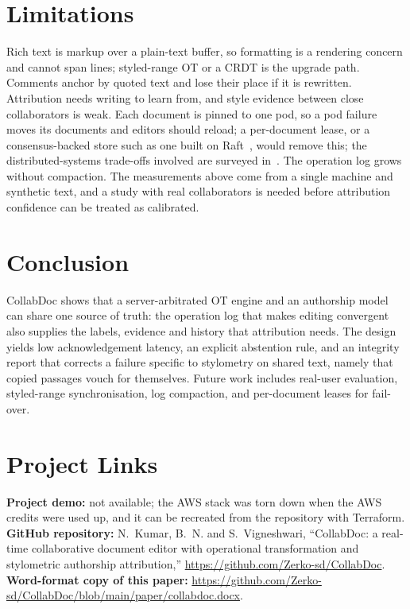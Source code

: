 \documentclass[conference]{IEEEtran}
\begin{document}
\section{Limitations}
Rich text is markup over a plain-text buffer, so formatting is a rendering concern and cannot span lines; styled-range OT or a CRDT is the upgrade path. Comments anchor by quoted text and lose their place if it is rewritten. Attribution needs writing to learn from, and style evidence between close collaborators is weak. Each document is pinned to one pod, so a pod failure moves its documents and editors should reload; a per-document lease, or a consensus-backed store such as one built on Raft~\cite{raft}, would remove this; the distributed-systems trade-offs involved are surveyed in~\cite{ddia}. The operation log grows without compaction. The measurements above come from a single machine and synthetic text, and a study with real collaborators is needed before attribution confidence can be treated as calibrated.

\section{Conclusion}
CollabDoc shows that a server-arbitrated OT engine and an authorship model can share one source of truth: the operation log that makes editing convergent also supplies the labels, evidence and history that attribution needs. The design yields low acknowledgement latency, an explicit abstention rule, and an integrity report that corrects a failure specific to stylometry on shared text, namely that copied passages vouch for themselves. Future work includes real-user evaluation, styled-range synchronisation, log compaction, and per-document leases for fail-over.

\section*{Project Links}
\noindent\textbf{Project demo:} not available; the AWS stack was torn down when the AWS credits were used up, and it can be recreated from the repository with Terraform.\\
\textbf{GitHub repository:} N.~Kumar, B.~N. and S.~Vigneshwari, ``CollabDoc: a real-time collaborative document editor with operational transformation and stylometric authorship attribution,'' \url{https://github.com/Zerko-sd/CollabDoc}.\\
\textbf{Word-format copy of this paper:} \url{https://github.com/Zerko-sd/CollabDoc/blob/main/paper/collabdoc.docx}.
\end{document}

